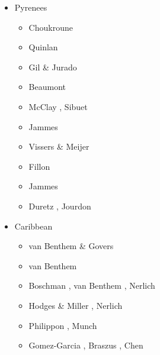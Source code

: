 \begin{itemize}
\item {Pyrenees} 

\begin{scriptsize}
\begin{itemize}
\item[\nineteenninetytwo] Choukroune \cite{chou92}
\item[\nineteenninetythree] Quinlan \etal \cite{qubh93}
\item[\nineteenninetyeight] Gil \& Jurado \cite{giju98}
\item[\twothousand] Beaumont \etal \cite{bemh00}
\item[\twothousandfour] McClay \etal \cite{mcmg04}, Sibuet \etal \cite{siss04}
\item[\twothousandten] Jammes \etal \cite{jaml10}
\item[\twothousandtwelve] Vissers \& Meijer \cite{vime12}
\item[\twothousandthirteen] Fillon \etal \cite{fihv13b}
\item[\twothousandfourteen] Jammes \etal \cite{jahm14}
\item[\twothousandnineteen] Duretz \etal \cite{dual19}, Jourdon \etal \cite{jolm19}
\end{itemize}
\end{scriptsize}

\item{Caribbean} 

\begin{scriptsize}
\begin{itemize}
\item[\twothousandten] van Benthem \& Govers \cite{vago10}
\item[\twothousandthirteen] van Benthem \etal \cite{vags13}
\item[\twothousandfourteen] Boschman \etal \cite{bovt14}, van Benthem \etal \cite{vagw14},
                            Nerlich \etal \cite{necb14}
\item[\twothousandfifteen] Hodges \& Miller \cite{homi15}, Nerlich \etal \cite{necb15}
\item[\twothousandtwenty] Philippon \etal \cite{phvb20}, Munch \etal \cite{mugu20}
\item[\twothousandtwentyone] Gomez-Garcia \etal\cite{gols21}, Braszus \etal \cite{brga21},
                             Chen \etal \cite{chcb21}
\end{itemize}
\end{scriptsize}


\end{itemize}
